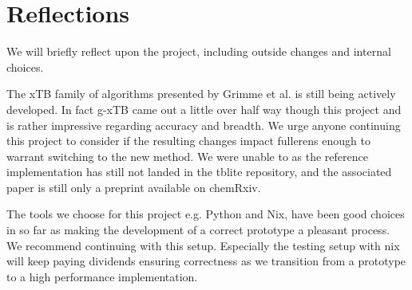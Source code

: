 \chapter{Reflections}
We will briefly reflect upon the project, including outside changes and internal choices.

The xTB family of algorithms presented by Grimme et al. is still being actively developed. In fact g-xTB came out a little over half way though this project and is rather impressive regarding accuracy and breadth. We urge anyone continuing this project to consider if the resulting changes impact fullerens enough to warrant switching to the new method. We were unable to as the reference implementation has still not landed in the tblite repository, and the associated paper is still only a preprint available on chemRxiv. 

The tools we choose for this project e.g. Python and Nix, have been good choices in so far as making the development of a correct prototype a pleasant process. We recommend continuing with this setup. Especially the testing setup with nix will keep paying dividends ensuring correctness as we transition from a prototype to a high performance implementation.

